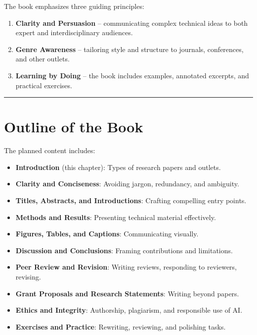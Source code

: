 \documentclass[
]{book}
\providecommand{\tightlist}{%
  \setlength{\itemsep}{0pt}\setlength{\parskip}{0pt}}
\theoremstyle{definition}
\theoremstyle{definition}
\theoremstyle{definition}
\theoremstyle{definition}
\theoremstyle{remark}
\begin{document}
The book emphasizes three guiding principles:

\begin{enumerate}
\def\labelenumi{\arabic{enumi}.}
\tightlist
\item
  \textbf{Clarity and Persuasion} -- communicating complex technical ideas to both expert and interdisciplinary audiences.\\
\item
  \textbf{Genre Awareness} -- tailoring style and structure to journals, conferences, and other outlets.\\
\item
  \textbf{Learning by Doing} -- the book includes examples, annotated excerpts, and practical exercises.
\end{enumerate}

\begin{center}\rule{0.5\linewidth}{0.5pt}\end{center}

\section{Outline of the Book}\label{outline-of-the-book}

The planned content includes:

\begin{itemize}
\tightlist
\item
  \textbf{Introduction} (this chapter): Types of research papers and outlets.\\
\item
  \textbf{Clarity and Conciseness}: Avoiding jargon, redundancy, and ambiguity.\\
\item
  \textbf{Titles, Abstracts, and Introductions}: Crafting compelling entry points.\\
\item
  \textbf{Methods and Results}: Presenting technical material effectively.\\
\item
  \textbf{Figures, Tables, and Captions}: Communicating visually.\\
\item
  \textbf{Discussion and Conclusions}: Framing contributions and limitations.\\
\item
  \textbf{Peer Review and Revision}: Writing reviews, responding to reviewers, revising.\\
\item
  \textbf{Grant Proposals and Research Statements}: Writing beyond papers.\\
\item
  \textbf{Ethics and Integrity}: Authorship, plagiarism, and responsible use of AI.\\
\item
  \textbf{Exercises and Practice}: Rewriting, reviewing, and polishing tasks.
\end{itemize}
\end{document}

